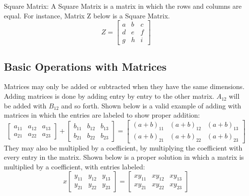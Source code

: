     \begin{definition}Square Matrix:
        A Square Matrix is a matrix in which the rows and columns are equal.
        For instance, Matrix Z below is a Square Matrix.
        \begin{equation*}%
            Z =
            \begin{bmatrix}
                a & b & c\\
                d & e & f\\
                g & h & i
            \end{bmatrix}
        \end{equation*}
    \end{definition}
        
    \subsection{Basic Operations with Matrices}
        Matrices may only be added or subtracted when they have the same dimensions.
        Adding matrices is done by adding entry by entry to the other matrix.
        $A_{12}$ will be added with $B_{12}$ and so forth.
        Shown below is a valid example of adding with matrices in which the entries are labeled to show proper addition:
        \begin{equation*}
            \begin{bmatrix}
                a_{11} & a_{12} & a_{13} \\
                a_{21} & a_{22} & a_{23}
            \end{bmatrix}
            +
            \begin{bmatrix}
                b_{11} & b_{12} & b_{13} \\
                b_{21} & b_{22} & b_{23}
            \end{bmatrix}
            =
            \begin{bmatrix}
                (a+b)_{11} & (a+b)_{12} & (a+b)_{13} \\
                (a+b)_{21} & (a+b)_{22} & (a+b)_{23}
            \end{bmatrix}
        \end{equation*}
        They may also be multiplied by a coefficient, by multiplying the coefficient with every entry in the matrix.
        Shown below is a proper solution in which a matrix is multiplied by a coefficient, with entries labeled:
         \begin{equation*}
            x
            \begin{bmatrix}
                y_{11} & y_{12} & y_{13} \\
                y_{21} & y_{22} & y_{23}
            \end{bmatrix}
            =
            \begin{bmatrix}
                xy_{11} & xy_{12} & xy_{13} \\
                xy_{21} & xy_{22} & xy_{23}
            \end{bmatrix}
        \end{equation*}
        
